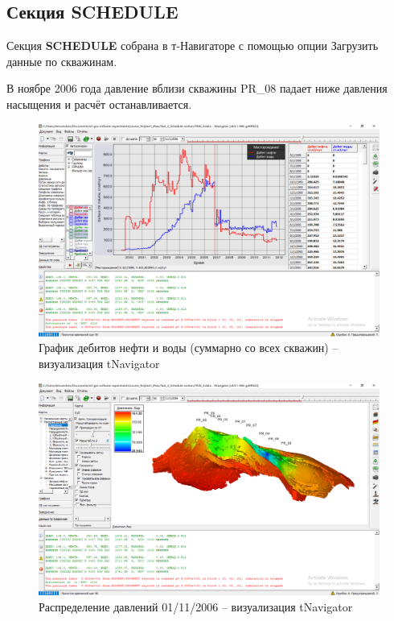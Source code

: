 \documentclass[a4paper,12pt]{article}
\begin{document}
\subsection{Секция SCHEDULE}
Секция \textbf{SCHEDULE} собрана в т-Навигаторе с помощью опции Загрузить данные по скважинам.

В ноябре 2006 года давление вблизи скважины PR\_08 падает ниже давления насыщения и расчёт останавливается.

\begin{figure}[H]
\center
\includegraphics[width=\textwidth]{rates_model_01}
\caption{График дебитов нефти и воды (суммарно со всех скважин) -- визуализация tNavigator}
\label{fig:rates_model_01}
\end{figure}

\begin{figure}[H]
\center
\includegraphics[width=\textwidth]{pressure_nov_2006_model_01}
\caption{Распределение давлений 01/11/2006 -- визуализация tNavigator}
\label{fig:pressure_nov_2006_model_01}
\end{figure}
\end{document}
